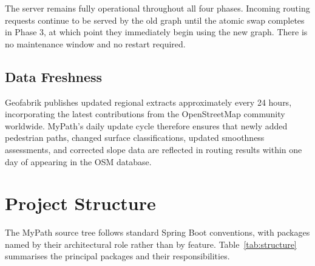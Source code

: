 \documentclass[12pt, a4paper]{report}
\begin{document}
\begin{greenbox}
The server remains fully operational throughout all four phases. Incoming routing requests continue to be served by the old graph until the atomic swap completes in Phase 3, at which point they immediately begin using the new graph. There is no maintenance window and no restart required.
\end{greenbox}

\subsection{Data Freshness}
\label{subsec:freshness}

Geofabrik publishes updated regional extracts approximately every 24 hours, incorporating the latest contributions from the OpenStreetMap community worldwide. MyPath's daily update cycle therefore ensures that newly added pedestrian paths, changed surface classifications, updated smoothness assessments, and corrected slope data are reflected in routing results within one day of appearing in the OSM database.

\section{Project Structure}
\label{sec:structure}

The MyPath source tree follows standard Spring Boot conventions, with packages named by their architectural role rather than by feature. Table~\ref{tab:structure} summarises the principal packages and their responsibilities.
\end{document}
